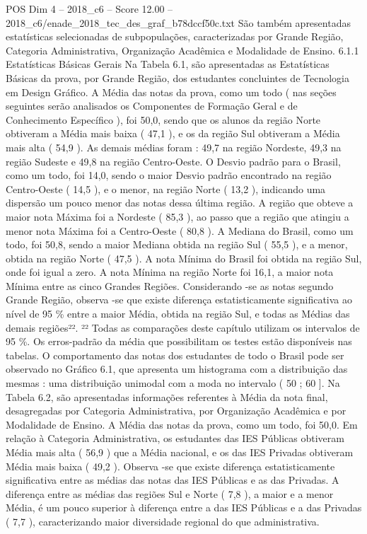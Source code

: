 \begin{textsample}{POS Dim 4 – 2018\_c6 – Score 12.00 – 2018\_c6/enade\_2018\_tec\_des\_graf\_b78dccf50c.txt}
São também apresentadas estatísticas selecionadas de subpopulações, caracterizadas por Grande Região, Categoria Administrativa, Organização Acadêmica e Modalidade de Ensino. 6.1.1 Estatísticas Básicas Gerais Na Tabela 6.1, são apresentadas as Estatísticas Básicas da prova, por Grande Região, dos estudantes concluintes de Tecnologia em Design Gráfico.
A Média das notas da prova, como um todo ( nas seções seguintes serão analisados os Componentes de Formação Geral e de Conhecimento Específico ), foi 50,0, sendo que os alunos da região Norte obtiveram a Média mais baixa ( 47,1 ), e os da região Sul obtiveram a Média mais alta ( 54,9 ).
As demais médias foram : 49,7 na região Nordeste, 49,3 na região Sudeste e 49,8 na região Centro-Oeste.
O Desvio padrão para o Brasil, como um todo, foi 14,0, sendo o maior Desvio padrão encontrado na região Centro-Oeste ( 14,5 ), e o menor, na região Norte ( 13,2 ), indicando uma dispersão um pouco menor das notas dessa última região.
A região que obteve a maior nota Máxima foi a Nordeste ( 85,3 ), ao passo que a região que atingiu a menor nota Máxima foi a Centro-Oeste ( 80,8 ).
A Mediana do Brasil, como um todo, foi 50,8, sendo a maior Mediana obtida na região Sul ( 55,5 ), e a menor, obtida na região Norte ( 47,5 ).
A nota Mínima do Brasil foi obtida na região Sul, onde foi igual a zero.
A nota Mínima na região Norte foi 16,1, a maior nota Mínima entre as cinco Grandes Regiões.
Considerando -se as notas segundo Grande Região, observa -se que existe diferença estatisticamente significativa ao nível de 95 \% entre a maior Média, obtida na região Sul, e todas as Médias das demais regiões²². ²² Todas as comparações deste capítulo utilizam os intervalos de 95 \%.
Os erros-padrão da média que possibilitam os testes estão disponíveis nas tabelas.
O comportamento das notas dos estudantes de todo o Brasil pode ser observado no Gráfico 6.1, que apresenta um histograma com a distribuição das mesmas : uma distribuição unimodal com a moda no intervalo ( 50 ; 60 ].
Na Tabela 6.2, são apresentadas informações referentes à Média da nota final, desagregadas por Categoria Administrativa, por Organização Acadêmica e por Modalidade de Ensino.
A Média das notas da prova, como um todo, foi 50,0.
Em relação à Categoria Administrativa, os estudantes das IES Públicas obtiveram Média mais alta ( 56,9 ) que a Média nacional, e os das IES Privadas obtiveram Média mais baixa ( 49,2 ).
Observa -se que existe diferença estatisticamente significativa entre as médias das notas das IES Públicas e as das Privadas.
A diferença entre as médias das regiões Sul e Norte ( 7,8 ), a maior e a menor Média, é um pouco superior à diferença entre a das IES Públicas e a das Privadas ( 7,7 ), caracterizando maior diversidade regional do que administrativa.

\end{textsample}
